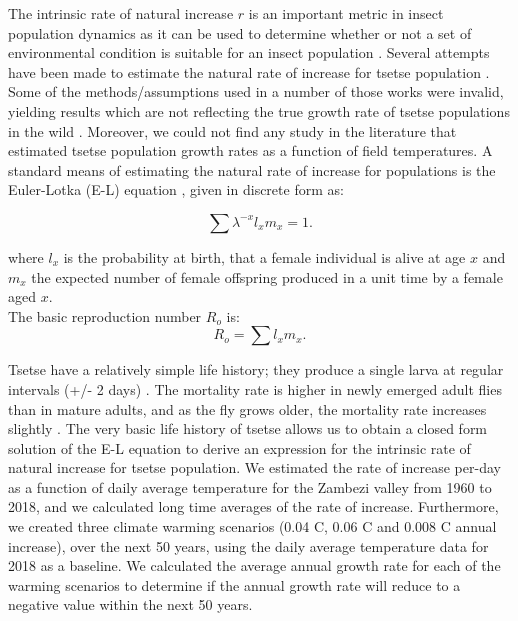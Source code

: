 \documentclass[10pt,a4paper]{article}
\begin{document}
The intrinsic rate of natural increase $r$ is an important metric in insect population dynamics as it can be used to determine whether or not a set of environmental condition is suitable for an insect population \cite{Birch1948}. Several attempts have been made to estimate the natural rate of increase for tsetse population . Some of the methods/assumptions used in a number of those works were invalid, yielding results which are not reflecting the true growth rate of tsetse populations in the wild \cite{VanSickle1988a}. Moreover, we could not find any study in the literature that estimated tsetse population growth rates as a function of field temperatures. 
A standard means of estimating the natural rate of increase for populations is the Euler-Lotka (E-L) equation \cite{Birch1948,Zidon2015}, given in discrete form as:

\begin{equation}
\label{equation3}
\sum \lambda^{-x}l_{x}m_{x} = 1.
\end{equation}

where  $l_{x}$ is the probability at birth, that a female individual is alive at age $x$ and $m_{x}$ the expected number of female offspring produced in a unit time by a female aged $x$.  \\ 

The basic reproduction number $R_{o}$ is:
\begin{equation}
\label{equation4}
R_{o}= \sum l_{x}m_{x}. 
\end{equation}

Tsetse have a relatively simple life history; they produce a single larva at regular intervals (+/- 2 days) \cite{Ackley2017}. The mortality rate is higher in newly emerged adult flies than in mature adults, and as the fly grows older, the mortality rate increases slightly \cite{Hargrove2013b}.   The very basic life history of tsetse allows us to obtain a closed form solution of the E-L equation to derive an expression for the intrinsic rate of natural increase for tsetse population. We estimated the rate of increase per-day as a function of daily average temperature for the Zambezi valley from 1960 to 2018, and we calculated long time averages of the  rate of increase. Furthermore, we created three climate warming scenarios (0.04 \degree C, 0.06 \degree C and 0.008 \degree C annual increase), over the next 50 years,  using the daily average temperature data for 2018 as a baseline. We calculated the average annual growth rate for each of the warming scenarios to determine if the annual growth rate will reduce to a negative value within the next 50 years.     
\end{document}
